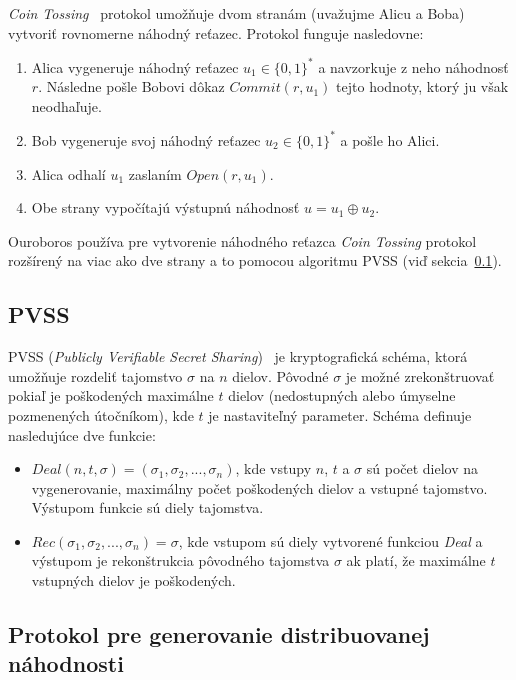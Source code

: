 \textit{Coin Tossing}~\cite{coinFlipBlum} protokol umožňuje dvom stranám (uvažujme Alicu a Boba) vytvoriť rovnomerne náhodný reťazec. Protokol funguje nasledovne:
\begin{enumerate}
	\item Alica vygeneruje náhodný reťazec $u_1 \in \{0,1\}^*$ a navzorkuje z neho náhodnosť $r$. Následne pošle Bobovi dôkaz $Commit(r,u_1)$ tejto hodnoty, ktorý ju však neodhaľuje.
	\item Bob vygeneruje svoj náhodný reťazec $u_2 \in \{0,1\}^*$ a pošle ho Alici. 
	\item Alica odhalí $u_1$ zaslaním $Open(r,u_1)$.
	\item Obe strany vypočítajú výstupnú náhodnosť $u = u_1 \oplus u_2$.
\end{enumerate}

Ouroboros používa pre vytvorenie náhodného reťazca \textit{Coin Tossing} protokol rozšírený na viac ako dve strany a to pomocou algoritmu PVSS (viď sekcia~\ref{subsec:ouroboros-pvss}).

\subsection{PVSS}\label{subsec:ouroboros-pvss}

PVSS (\textit{Publicly Verifiable Secret Sharing})~\cite{pvssFeldman} je kryptografická schéma, ktorá umožňuje rozdeliť tajomstvo $\sigma$ na $n$ dielov. Pôvodné $\sigma$ je možné zrekonštruovať pokiaľ je poškodených maximálne $t$ dielov (nedostupných alebo úmyselne pozmenených útočníkom), kde $t$ je nastaviteľný parameter. Schéma definuje nasledujúce dve funkcie:
\begin{itemize}
	\item $Deal(n, t, \sigma) = (\sigma_1, \sigma_2, ..., \sigma_n)$, kde vstupy $n$, $t$ a $\sigma$ sú počet dielov na vygenerovanie, maximálny počet poškodených dielov a vstupné tajomstvo. Výstupom funkcie sú diely tajomstva.
	\item $Rec(\sigma_1, \sigma_2, ..., \sigma_n) = \sigma$, kde vstupom sú diely vytvorené funkciou \textit{Deal} a výstupom je rekonštrukcia pôvodného tajomstva $\sigma$ ak platí, že maximálne $t$ vstupných dielov je poškodených.
\end{itemize}

\subsection{Protokol pre generovanie distribuovanej náhodnosti}
 
